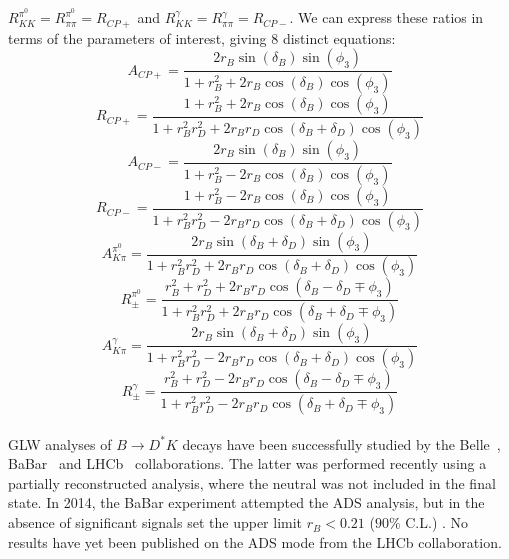 \documentclass[oneside,12pt]{article}
\begin{document}
$R_{KK}^{\pi^{0}}=R_{\pi\pi}^{\pi^{0}}=R_{CP+}$ and
$R_{KK}^{\gamma}=R_{\pi\pi}^{\gamma}=R_{CP-}$. We can express these ratios in
terms of the parameters of interest, giving 8 distinct equations: 
  \begin{equation}
		A_{CP+}=\frac{2r_{B}\sin(\delta_{B})\sin(\phi_{3})}{1+r_{B}^{2}+2r_{B}\cos(\delta_{B})\cos(\phi_{3})}
    \label{eq:ACPPlus}
  \end{equation}
  \begin{equation}
		R_{CP+}=\frac{1 + r_{B}^{2} + 2r_{B}\cos(\delta_{B})\cos(\phi_{3})}{1+r_{B}^{2}r_{D}^{2}+2r_{B}r_{D}\cos(\delta_{B}+\delta_{D})\cos(\phi_{3})}
    \label{eq:RCPPlus}
  \end{equation}
  \begin{equation}
		A_{CP-}=\frac{2r_{B}\sin(\delta_{B})\sin(\phi_{3})}{1+r_{B}^{2}-2r_{B}\cos(\delta_{B})\cos(\phi_{3})}
    \label{eq:ACPMinus}
  \end{equation}
  \begin{equation}
		R_{CP-}=\frac{1 + r_{B}^{2} - 2r_{B}\cos(\delta_{B})\cos(\phi_{3})}{1+r_{B}^{2}r_{D}^{2}-2r_{B}r_{D}\cos(\delta_{B}+\delta_{D})\cos(\phi_{3})}
    \label{eq:RCPMinus}
  \end{equation}
  \begin{equation}
		A_{K\pi}^{\pi^{0}}=\frac{2r_{B}\sin(\delta_{B}+\delta_{D})\sin(\phi_{3})}{1+r_{B}^{2}r_{D}^{2}+2r_{B}r_{D}\cos(\delta_{B}+\delta_{D})\cos(\phi_{3})}
    \label{eq:AfavPi0}
  \end{equation}
  \begin{equation}
		R_{\pm}^{\pi^{0}}=\frac{r_{B}^{2} + r_{D}^{2} + 2r_{B}r_{D}\cos(\delta_{B}-\delta_{D}\mp \phi_{3})}{1+r_{B}^{2}r_{D}^{2}+2r_{B}r_{D}\cos(\delta_{B}+\delta_{D}\mp \phi_{3})}
    \label{eq:RPlusMinusPi0}
  \end{equation}
  \begin{equation}
		A_{K\pi}^{\gamma}=\frac{2r_{B}\sin(\delta_{B}+\delta_{D})\sin(\phi_{3})}{1+r_{B}^{2}r_{D}^{2}-2r_{B}r_{D}\cos(\delta_{B}+\delta_{D})\cos(\phi_{3})}
    \label{eq:AfavGamma}
  \end{equation}
  \begin{equation}
		R_{\pm}^{\gamma}=\frac{r_{B}^{2} + r_{D}^{2} - 2r_{B}r_{D}\cos(\delta_{B}-\delta_{D}\mp \phi_{3})}{1+r_{B}^{2}r_{D}^{2}-2r_{B}r_{D}\cos(\delta_{B}+\delta_{D}\mp \phi_{3})}
    \label{eq:RPlusMinusGamma}
  \end{equation}
\\
\noindent GLW analyses of $B\rightarrow D^{*}K$ decays have been successfully
studied by the Belle~\cite{BelleGLW}, BaBar~\cite{BaBarGLW} and
LHCb~\cite{PartReco} collaborations. The latter was performed recently using a
partially reconstructed analysis, where the neutral was not included in the
final state. In 2014, the BaBar experiment attempted the ADS analysis, but in
the absence of significant signals set the upper limit $r_B<0.21$ ($90\%$ C.L.)
\cite{BaBarADS}. No results have yet been published on the ADS mode from the
LHCb collaboration. 
\end{document}
